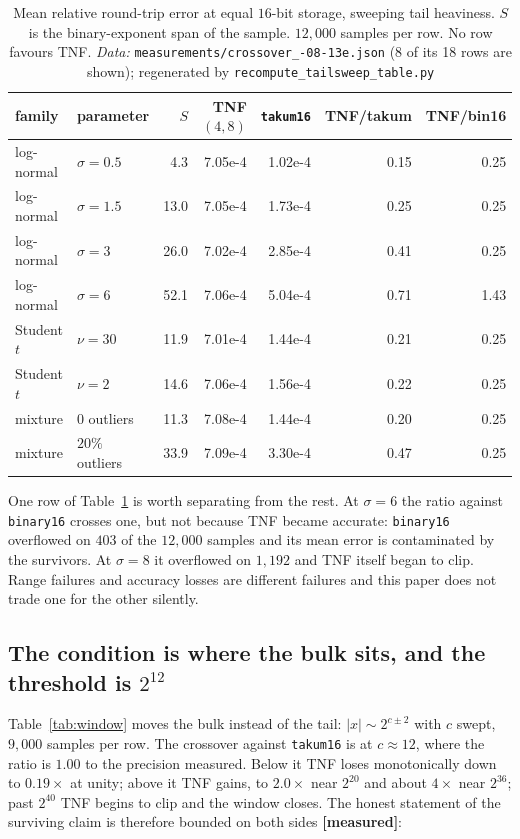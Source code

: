 \begin{table}[htbp]\centering\small
\caption{Mean relative round-trip error at equal $16$-bit storage, sweeping tail
heaviness. $S$ is the binary-exponent span of the sample. $12{,}000$ samples per
row. No row favours TNF. \emph{Data:} \texttt{measurements/\allowbreak crossover\_-08-13e.json} (8 of its 18 rows are shown); regenerated by \texttt{recompute\_\allowbreak tailsweep\_\allowbreak table.py}}
\label{tab:tailsweep}
\begin{tabular}{llrrrrr}
\hline
family & parameter & $S$ & TNF$(4,8)$ & \texttt{takum16} & TNF/takum & TNF/bin16 \\
\hline
log-normal & $\sigma=0.5$ & 4.3 & 7.05e-4 & 1.02e-4 & 0.15 & 0.25 \\
log-normal & $\sigma=1.5$ & 13.0 & 7.05e-4 & 1.73e-4 & 0.25 & 0.25 \\
log-normal & $\sigma=3$ & 26.0 & 7.02e-4 & 2.85e-4 & 0.41 & 0.25 \\
log-normal & $\sigma=6$ & 52.1 & 7.06e-4 & 5.04e-4 & 0.71 & 1.43 \\
Student $t$ & $\nu=30$ & 11.9 & 7.01e-4 & 1.44e-4 & 0.21 & 0.25 \\
Student $t$ & $\nu=2$ & 14.6 & 7.06e-4 & 1.56e-4 & 0.22 & 0.25 \\
mixture & $0$ outliers & 11.3 & 7.08e-4 & 1.44e-4 & 0.20 & 0.25 \\
mixture & $20\%$ outliers & 33.9 & 7.09e-4 & 3.30e-4 & 0.47 & 0.25 \\
\hline
\end{tabular}
\end{table}

One row of Table~\ref{tab:tailsweep} is worth separating from the rest. At
$\sigma=6$ the ratio against \texttt{binary16} crosses one, but not because TNF
became accurate: \texttt{binary16} overflowed on $403$ of the $12{,}000$ samples and
its mean error is contaminated by the survivors. At $\sigma=8$ it overflowed on
$1{,}192$ and TNF itself began to clip. Range failures and accuracy losses are
different failures and this paper does not trade one for the other silently.

\subsection{The condition is where the bulk sits, and the threshold is $2^{12}$}

Table~\ref{tab:window} moves the bulk instead of the tail: $|x|\sim 2^{c\pm 2}$
with $c$ swept, $9{,}000$ samples per row. The crossover against \texttt{takum16}
is at $c\approx 12$, where the ratio is $1.00$ to the precision measured. Below it
TNF loses monotonically down to $0.19\times$ at unity; above it TNF gains, to
$2.0\times$ near $2^{20}$ and about $4\times$ near $2^{36}$; past $2^{40}$ TNF
begins to clip and the window closes. The honest statement of the surviving claim
is therefore bounded on both sides \textbf{[measured]}:

